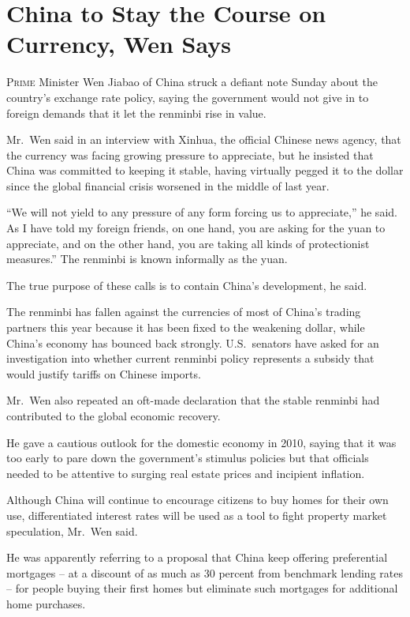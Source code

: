 ﻿\documentclass[12pt]{article}
\begin{document}
\section{China to Stay the Course on Currency, Wen Says}

\lettrine{P}{rime} Minister Wen Jiabao of China struck a defiant note Sunday
about the country's exchange rate policy, saying the government would not give in to foreign demands
that it let the renminbi rise in value.

Mr.~Wen said in an interview with Xinhua, the official Chinese news agency, that the currency was
facing growing pressure to appreciate, but he insisted that China was committed to keeping it
stable, having virtually pegged it to the dollar since the global financial crisis worsened in the
middle of last year.

``We will not yield to any pressure of any form forcing us to appreciate,'' he said. As I have told
my foreign friends, on one hand, you are asking for the yuan to appreciate, and on the other hand,
you are taking all kinds of protectionist measures.'' The renminbi is known informally as the yuan.

The true purpose of these calls is to contain China's development, he said.

The renminbi has fallen against the currencies of most of China's trading partners this year because
it has been fixed to the weakening dollar, while China's economy has bounced back strongly.
U.S.~senators have asked for an investigation into whether current renminbi policy represents a
subsidy that would justify tariffs on Chinese imports.

Mr.~Wen also repeated an oft-made declaration that the stable renminbi had contributed to the global
economic recovery.

He gave a cautious outlook for the domestic economy in 2010, saying that it was too early to pare
down the government's stimulus policies but that officials needed to be attentive to surging real
estate prices and incipient inflation.

Although China will continue to encourage citizens to buy homes for their own use, differentiated
interest rates will be used as a tool to fight property market speculation, Mr.~Wen said.

He was apparently referring to a proposal that China keep offering preferential mortgages -- at a
discount of as much as 30 percent from benchmark lending rates -- for people buying their first
homes but eliminate such mortgages for additional home purchases.
\end{document}
